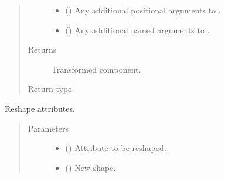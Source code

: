\documentclass[letterpaper,10pt,english]{sphinxmanual}
\begin{document}
\begin{fulllineitems}
\begin{fulllineitems}
\begin{quote}
\begin{description}
\begin{itemize}
\item {} 
 () \textendash{} Any additional positional arguments to .

\item {} 
 () \textendash{} Any additional named arguments to .

\end{itemize}

\item[{Returns}] \leavevmode
{} \textendash{} Transformed component.

\item[{Return type}] \leavevmode
{\hyperref[\detokenize{api/base_classes:geology.src.base_spatial.SpatialComponent}]{}}

\end{description}\end{quote}

\end{fulllineitems}


\begin{fulllineitems}
\label{\detokenize{api/states:geology.src.States.reshape}}
Reshape  attributes.
\begin{quote}\begin{description}
\item[{Parameters}] \leavevmode\begin{itemize}
\item {} 
 (\sphinxstyleliteralemphasis{\sphinxupquote{, }}) \textendash{} Attribute to be reshaped.

\item {} 
 () \textendash{} New shape.


\end{itemize}
\end{description}
\end{quote}
\end{fulllineitems}
\end{fulllineitems}
\end{document}
